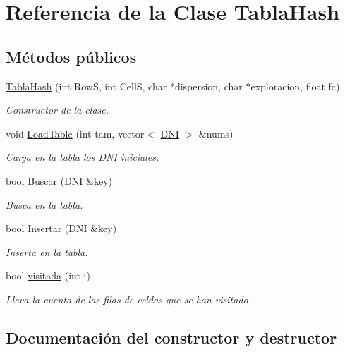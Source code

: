 \hypertarget{classTablaHash}{}\section{Referencia de la Clase Tabla\+Hash}
\label{classTablaHash}
\subsection*{Métodos públicos}
\begin{DoxyCompactItemize}
\item 
\hyperlink{classTablaHash_a4a1e8a8ce9beddf153293efe6bb137ae}{Tabla\+Hash} (int RowS, int CellS, char $\ast$dispersion, char $\ast$exploracion, float fc)
\begin{DoxyCompactList}\small\item\em Constructor de la clase. \end{DoxyCompactList}\item 
void \hyperlink{classTablaHash_ad936073d56db493bc327aee20ab30769}{Load\+Table} (int tam, vector$<$ \hyperlink{classDNI}{D\+NI} $>$ \&nums)
\begin{DoxyCompactList}\small\item\em Carga en la tabla los \hyperlink{classDNI}{D\+NI} iniciales. \end{DoxyCompactList}\item 
bool \hyperlink{classTablaHash_a063c478c2acb24fdba7bbc90c9d6bda9}{Buscar} (\hyperlink{classDNI}{D\+NI} \&key)
\begin{DoxyCompactList}\small\item\em Busca en la tabla. \end{DoxyCompactList}\item 
bool \hyperlink{classTablaHash_a3030b51cfd5a0e50d796cc6c2383ab33}{Insertar} (\hyperlink{classDNI}{D\+NI} \&key)
\begin{DoxyCompactList}\small\item\em Inserta en la tabla. \end{DoxyCompactList}\item 
bool \hyperlink{classTablaHash_ae6ff3c4b4dce04e4eac89ba63dfc6faa}{visitada} (int i)
\begin{DoxyCompactList}\small\item\em Lleva la cuenta de las filas de celdas que se han visitado. \end{DoxyCompactList}\end{DoxyCompactItemize}


\subsection{Documentación del constructor y destructor}
\mbox{\label{classTablaHash_a4a1e8a8ce9beddf153293efe6bb137ae}} 
